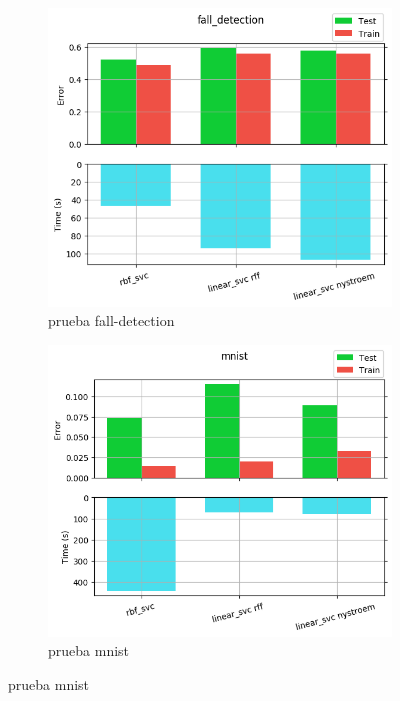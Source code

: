 \begin{figure}[ht]
  \centering
  \begin{subfigure}[b]{0.5\linewidth}
    \centering\includegraphics[width=\imgscale\linewidth]{Figures/1_1/fall_detection}
    \caption{prueba fall-detection}
    \label{fig:1_1_fall_detection}
  \end{subfigure}%
  \begin{subfigure}[b]{0.5\linewidth}
    \centering\includegraphics[width=\imgscale\linewidth]{Figures/1_1/mnist}
    \caption{prueba mnist}
    \label{fig:1_1_mnist}
  \end{subfigure}
\end{figure}


